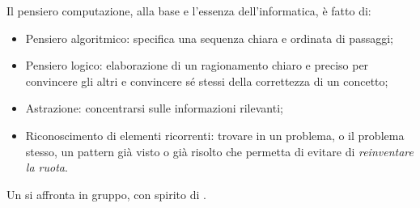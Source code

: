 \documentclass[../main.tex]{subfiles}
\begin{document}
Il pensiero computazione, alla base e l’essenza dell’informatica, è fatto di:
\begin{itemize}
    \item Pensiero algoritmico: specifica una sequenza chiara e ordinata di passaggi;
    \item Pensiero logico: elaborazione di un ragionamento chiaro e preciso per convincere gli altri e convincere sé stessi della correttezza di un concetto;
    \item Astrazione: concentrarsi sulle informazioni rilevanti;
    \item Riconoscimento di elementi ricorrenti: trovare in un problema, o il problema stesso, un pattern già visto o già risolto che permetta di evitare di \textit{reinventare la ruota}.
\end{itemize}
Un  si affronta in gruppo, con spirito di .
\end{document}
